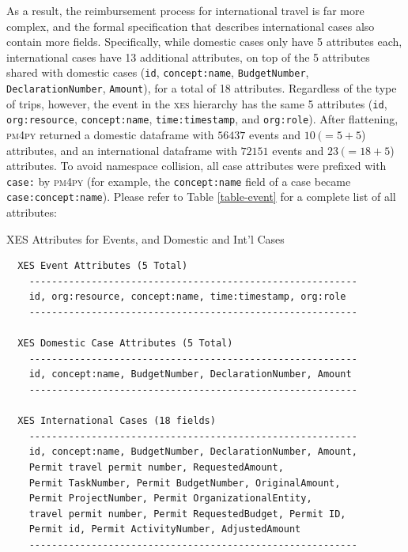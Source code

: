 \documentclass[conference]{IEEEtran}
\begin{document}
As a result, the reimbursement process for international travel is
far more complex, and the formal specification that describes
international cases also contain more fields.
Specifically, while domestic cases only have 5 attributes
each, international cases have 13 additional attributes, on top of
the 5 attributes shared with domestic cases
(\texttt{id}, \texttt{concept:name}, \texttt{BudgetNumber},
\texttt{DeclarationNumber}, \texttt{Amount}), for a total of 18 attributes.
Regardless of the type of trips, however,
the event in the \textsc{xes} hierarchy has the same 5 attributes
(\texttt{id}, \texttt{org:resource}, \texttt{concept:name},
\texttt{time:timestamp}, and \texttt{org:role}).
After flattening, \textsc{pm4py} returned a
domestic dataframe with $56437$ events and $10~(=5+5$) attributes, and
an international dataframe with $72151$ events and $23~(=18+5$) attributes.
To avoid namespace collision, all case attributes were prefixed with
\texttt{case:} by \textsc{pm4py} (for example, the \texttt{concept:name} field of a case
became \texttt{case:concept:name}). Please refer to Table
\ref{table-event} for a complete list of all attributes:

\begin{table}[htbp]
\caption{XES Attributes for Events, and Domestic and Int'l Cases}
\vspace{-1em}
\begin{center}
\begin{verbatim}
  XES Event Attributes (5 Total)
    ----------------------------------------------------------
    id, org:resource, concept:name, time:timestamp, org:role
    ----------------------------------------------------------

  XES Domestic Case Attributes (5 Total)
    ----------------------------------------------------------
    id, concept:name, BudgetNumber, DeclarationNumber, Amount
    ----------------------------------------------------------

  XES International Cases (18 fields)
    ----------------------------------------------------------
    id, concept:name, BudgetNumber, DeclarationNumber, Amount,
    Permit travel permit number, RequestedAmount,
    Permit TaskNumber, Permit BudgetNumber, OriginalAmount,
    Permit ProjectNumber, Permit OrganizationalEntity,
    travel permit number, Permit RequestedBudget, Permit ID,
    Permit id, Permit ActivityNumber, AdjustedAmount        
    ----------------------------------------------------------
\end{verbatim}
\end{center}
\vspace{-1em}
\label{table-event}
\end{table}
\end{document}

